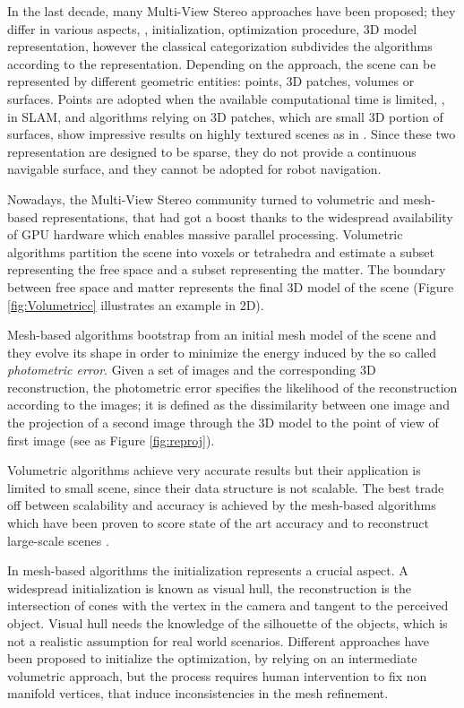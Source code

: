 In the last decade, many Multi-View Stereo approaches have been proposed; they differ in various aspects, \eg, initialization, optimization procedure, 3D model representation, however the classical categorization \cite{seitz2006comparison} subdivides the algorithms according to the representation.
Depending on the approach, the scene can be represented by different geometric entities: points, 3D patches, volumes or surfaces.
Points are adopted when the available computational time is limited, \eg, in SLAM, and algorithms relying on 3D patches, which are small 3D portion of surfaces,  show impressive results on highly textured scenes as in \cite{furukawa2009reconstructing}. 
Since these two representation are designed to be sparse, they do not provide a continuous navigable surface, and they cannot be adopted for robot navigation.

Nowadays, the Multi-View Stereo community turned to volumetric and mesh-based representations, that had got a boost thanks to the widespread availability of GPU hardware which enables massive parallel processing.
Volumetric algorithms partition the scene into voxels or tetrahedra and estimate a subset representing the free space and a subset representing the matter. The boundary between free space and matter represents the final 3D model of the scene (Figure \ref{fig:Volumetricc} illustrates an example in 2D). 

Mesh-based algorithms bootstrap from an initial mesh model of the scene and they evolve its shape in order to minimize the energy induced by the so called \emph{photometric error}.
Given a set of images and the corresponding 3D reconstruction, the photometric error specifies the likelihood of the reconstruction according to the images;  it is defined as the dissimilarity  between one image and the projection of a second image through the 3D model to the point of view of first image (see as Figure \ref{fig:reproj}).

Volumetric algorithms achieve very accurate results but their application is limited to small scene, since their data structure is not scalable. 
The best trade off between scalability and accuracy is achieved by the mesh-based algorithms which have been proven to score state of the art accuracy \cite{li2015detail} and to reconstruct large-scale scenes \cite{vu_et_al_2012}.


In mesh-based algorithms the initialization represents a crucial aspect.
A widespread initialization is known as visual hull, the reconstruction is the intersection of cones with the vertex in the camera and tangent to the perceived object.
Visual hull needs the knowledge of the silhouette of the objects, which is not a realistic assumption for real world scenarios.
Different approaches have been proposed to initialize the optimization, by relying on an intermediate volumetric approach, but the process requires human intervention to fix non manifold vertices, that induce inconsistencies in the mesh refinement.

